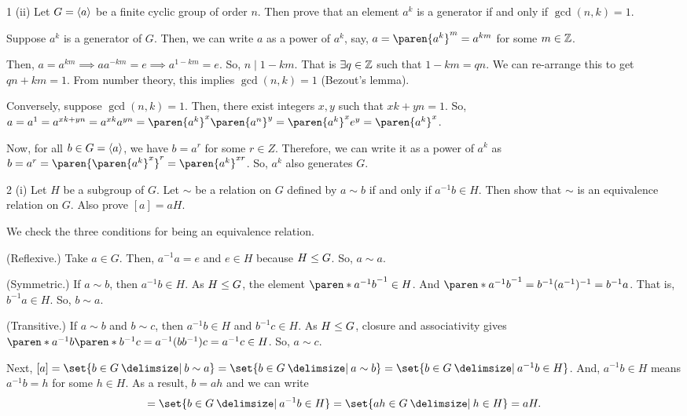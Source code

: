 \documentclass[11pt]{penrose}
\begin{document}
\begin{problem}{1 (ii)}
    Let $G = \langle a\rangle$ be a finite cyclic group of order $n$. Then prove that an element $a^k$ is a generator if and only if $\gcd(n, k) = 1$.

    \solution Suppose $a^k$ is a generator of $G$. Then, we can write $a$ as a power of $a^k$, say, $a = \paren{a^k}^m = a^{km}$ for some $m \in \mathbb{Z}$.

    Then, $a = a^{km} \implies a a^{-km} = e \implies a^{1-km} = e$. So, $n \mid 1 - km$. That is $\exists q \in \mathbb{Z}$ such that $1 - km = qn$. We can re-arrange this to get $qn + km = 1$. From number theory, this implies $\gcd(n,k)=1$ (Bezout's lemma).

    Conversely, suppose $\gcd(n,k)=1$. Then, there exist integers $x, y$ such that $xk + yn = 1$. So, $a = a^1 = a^{xk + yn} = a^{xk} a^{yn} = \paren{a^{k}}^{x} \paren{a^{n}}^{y} = \paren{a^{k}}^{x} e^{y} = \paren{a^{k}}^{x}$.

    Now, for all $b \in G=\langle a\rangle$, we have $b = a^r$ for some $r \in Z$. Therefore, we can write it as a power of $a^k$ as $b = a^r = \paren{\paren{a^{k}}^{x}}^{r} = \paren{a^{k}}^{xr}$. So, $a^k$ also generates $G$.
\end{problem}

\begin{problem}{2 (i)}
    Let $H$ be a subgroup of $G$. Let $\sim$ be a relation on $G$ defined by $a \sim b$ if and only if $a^{-1} b \in H$. Then show that $\sim$ is an equivalence relation on $G$. Also prove $[a] = aH$.

    \solution We check the three conditions for being an equivalence relation.
    
    (Reflexive.) Take $a \in G$. Then, $a^{-1} a = e$ and $e \in H$ because $H \mathrel{\leq} G$. So, $a \sim a$.

    (Symmetric.) If $a \sim b$, then $a^{-1} b \in H$. As $H \mathrel{\leq} G$, the element $\paren*{a^{-1} b}^{-1} \in H$. And $\paren*{a^{-1} b}^{-1} = b^{-1} (a^{-1})^{-1} = b^{-1} a$. That is, $b^{-1} a \in H$. So, $b \sim a$.

    (Transitive.) If $a \sim b$ and $b \sim c$, then $a^{-1} b \in H$ and $b^{-1} c \in H$. As $H \mathrel{\leq} G$, closure and associativity gives $\paren*{a^{-1} b} \paren*{b^{-1} c} = a^{-1} (b b^{-1}) c = a^{-1} c \in H$. So, $a \sim c$.

    Next, $[a] = \set{b \in G \st b \sim a} = \set{b \in G \st a \sim b} = \set{b \in G \st a^{-1} b \in H}$. And, $a^{-1} b \in H$ means $a^{-1} b = h$ for some $h \in H$. As a result, $b = ah$ and we can write
    \begin{equation*}
        [a] = \set{b \in G \st a^{-1} b \in H} = \set{ah \in G \st h \in H} = aH.
    \end{equation*}
\end{problem}
\end{document}
